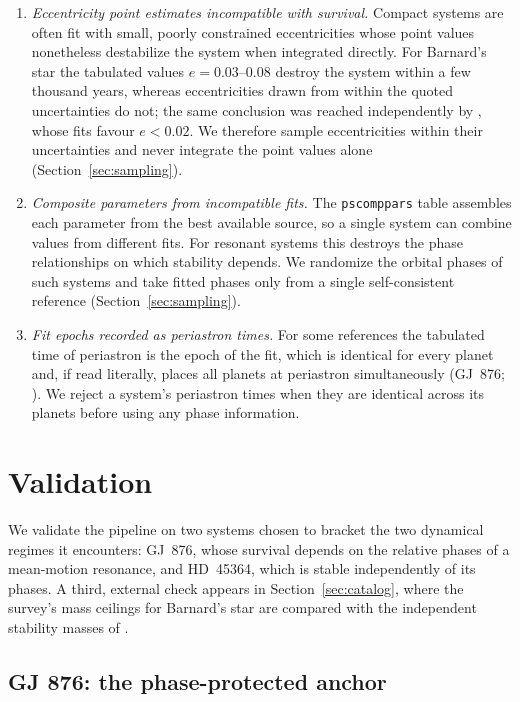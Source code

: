 \documentclass[fleqn,usenatbib]{mnras}
\begin{document}
\begin{enumerate}
\item \textit{Eccentricity point estimates incompatible with survival.}
Compact systems are often fit with small, poorly constrained
eccentricities whose point values nonetheless destabilize the system when
integrated directly. For Barnard's star the tabulated values
$e = 0.03$--$0.08$ destroy the system within a few thousand years, whereas
eccentricities drawn from within the quoted uncertainties do not; the same
conclusion was reached independently by \citet{Basant2025}, whose fits
favour $e < 0.02$. We therefore sample eccentricities within their
uncertainties and never integrate the point values alone
(Section~\ref{sec:sampling}).
\item \textit{Composite parameters from incompatible fits.} The
\texttt{pscomppars} table assembles each parameter from the best available
source, so a single system can combine values from different fits. For
resonant systems this destroys the phase relationships on which stability
depends. We randomize the orbital phases of such systems and take fitted
phases only from a single self-consistent reference
(Section~\ref{sec:sampling}).
\item \textit{Fit epochs recorded as periastron times.} For some
references the tabulated time of periastron is the epoch of the fit, which
is identical for every planet and, if read literally, places all planets
at periastron simultaneously (GJ~876; \citealt{Rivera2010}). We reject a
system's periastron times when they are identical across its planets
before using any phase information.
\end{enumerate}

\section{Validation} \label{sec:validation}

We validate the pipeline on two systems chosen to bracket the two
dynamical regimes it encounters: GJ~876, whose survival depends on the
relative phases of a mean-motion resonance, and HD~45364, which is stable
independently of its phases. A third, external check appears in
Section~\ref{sec:catalog}, where the survey's mass ceilings for Barnard's
star are compared with the independent stability masses of
\citet{Byrne2026}.

\subsection{GJ 876: the phase-protected anchor} \label{sec:gj876}
\end{document}
